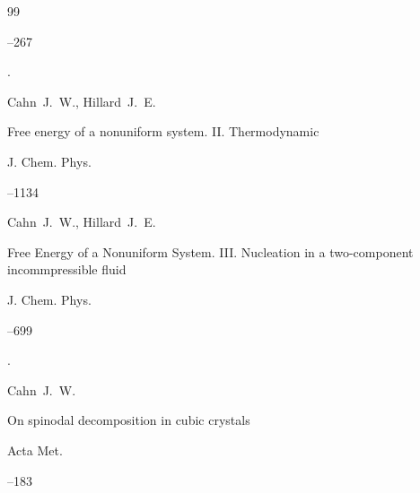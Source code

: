 \begin{thebibliography}{99}

--267


\moreref 

. \nofrills






\by Cahn~J.~W., Hillard~J.~E.

\paper Free energy of a nonuniform system. II. Thermodynamic

\jour J. Chem. Phys.




--1134







\by Cahn~J.~W., Hillard~J.~E.

\paper Free Energy of a Nonuniform System. III. Nucleation in a two-component incommpressible fluid

\jour J. Chem. Phys.




--699


\moreref 

. \nofrills








\by Cahn~J.~W.

\paper On spinodal decomposition in cubic crystals

\jour Acta Met.




--183








\end{thebibliography}
